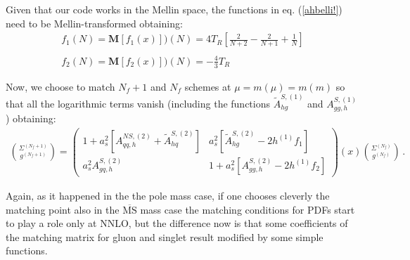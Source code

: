 \documentclass[10pt,a4paper]{article}
\begin{document}
Given that our code works in the Mellin space, the functions in eq. (\ref{ahbelli!}) need to be Mellin-transformed obtaining:
\begin{equation}\label{ahbellissimi!}
\begin{array}{l}
\displaystyle f_1(N) = \mathbf{M}[f_1(x)])(N)= 4 T_R\left[\frac2{N+2}-\frac2{N+1}+\frac1N\right]\\
\\
\displaystyle f_2(N) = \mathbf{M}[f_2(x)])(N)= -\frac43 T_R
\end{array}
\end{equation}

Now, we choose to match $N_f+1$ and $N_f$ schemes at $\mu = m(\mu) = m(m)$ so that all the logarithmic terms vanish (including the functions $\tilde{A}^{S,(1)}_{hg}$ and $A_{gg,h}^{S,(1)}$) obtaining:
\begin{equation}
\begin{array}{c}
\displaystyle {\Sigma^{(N_f+1)}\choose g^{(N_f+1)}}=\begin{pmatrix}1+a_s^2[A_{qq,h}^{N\!S,(2)}+\tilde{A}^{S,(2)}_{hq}] & a_s^2[\tilde{A}^{S,(2)}_{hg}-2h^{(1)}f_1]\\
a_s^2A^{S,(2)}_{gq,h} & 1+a_s^2[A_{gg,h}^{S,(2)}-2h^{(1)}f_2]\end{pmatrix}(x){\Sigma^{(N_f)} \choose g^{(N_f)}}\,.
\end{array}
\end{equation}

Again, as it happened in the the pole mass case, if one chooses
cleverly the matching point also in the $\overline{\mbox{MS}}$ mass
case the matching conditions for PDFs start to play a role only at
NNLO, but the difference now is that some coefficients of the matching
matrix for gluon and singlet result modified by some simple functions.
\end{document}
